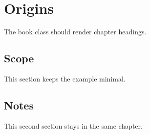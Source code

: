 \documentclass{book}
\begin{document}
\chapter{Origins}
The book class should render chapter headings.

\section{Scope}
This section keeps the example minimal.

\section{Notes}
This second section stays in the same chapter.
\end{document}
